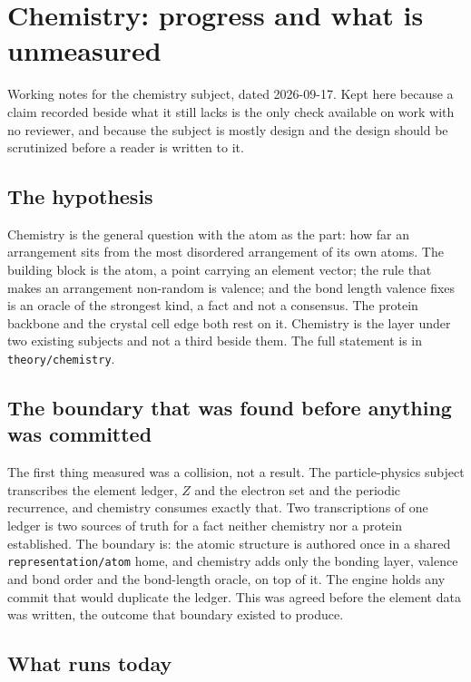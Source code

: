 \chapter{Chemistry: progress and what is unmeasured}

Working notes for the chemistry subject, dated 2026-09-17. Kept here because a claim recorded beside
what it still lacks is the only check available on work with no reviewer, and because the subject is
mostly design and the design should be scrutinized before a reader is written to it.

\section*{The hypothesis}

Chemistry is the general question with the atom as the part: how far an arrangement sits from the most
disordered arrangement of its own atoms. The building block is the atom, a point carrying an element
vector; the rule that makes an arrangement non-random is valence; and the bond length valence fixes is
an oracle of the strongest kind, a fact and not a consensus. The protein backbone and the crystal
cell edge both rest on it. Chemistry is the layer under two existing subjects and not a third
beside them. The full statement is in \texttt{theory/chemistry}.

\section*{The boundary that was found before anything was committed}

The first thing measured was a collision, not a result. The particle-physics subject transcribes the
element ledger, \(Z\) and the electron set and the periodic recurrence, and chemistry consumes exactly
that. Two transcriptions of one ledger is two sources of truth for a fact neither chemistry nor a
protein established. The boundary is: the atomic structure is authored once in a shared
\texttt{representation/atom} home, and chemistry adds only the bonding layer, valence and bond order
and the bond-length oracle, on top of it. The engine holds any commit that would duplicate the
ledger. This was agreed before the element data was written, the outcome that boundary
existed to produce.

\section*{What runs today}

